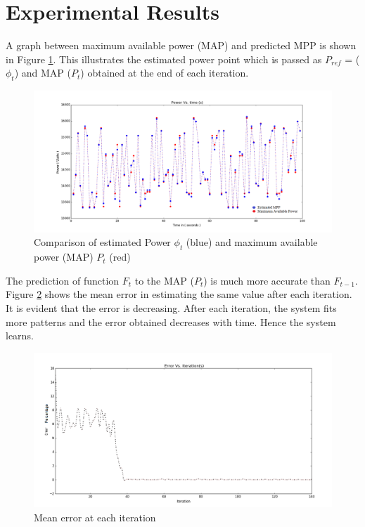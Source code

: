 \section{Experimental Results}
A graph between maximum available power (MAP) and predicted MPP is shown in Figure \ref{Figure:6}. This illustrates the estimated power point which is passed as $P_{ref}$ = ($\phi_t$) and MAP ($P_t$) obtained at the end of each iteration.
\begin{center}
\begin{figure}
\includegraphics[width=12cm,keepaspectratio]{6.png}
\caption{Comparison of estimated Power $\phi_t$ (blue) and maximum available power (MAP) $P_t$ (red)}
\label{Figure:6}    
\end{figure}
\end{center}
The prediction of function $F_t$  to the MAP ($P_t$) is much more accurate than $ F_{t-1}$. Figure \ref{Figure:7} shows the mean error in estimating the same value after each iteration. It is evident that the error is decreasing. After each iteration, the system fits more patterns and the error obtained decreases with time. Hence the system learns.
\begin{center}
\begin{figure}
\includegraphics[width=12cm,keepaspectratio]{error.png}
\caption{Mean error at each iteration}
\label{Figure:7}    
\end{figure}
\end{center}
